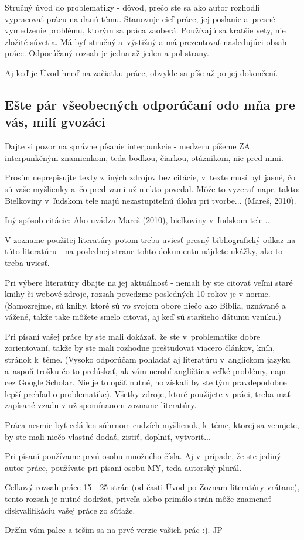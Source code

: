 \documentclass[../praca.tex]{subfiles}
\begin{document}
Stručný úvod do problematiky - dôvod, prečo ste sa ako autor rozhodli vypracovať
prácu na danú tému. Stanovuje cieľ práce, jej poslanie a~presné vymedzenie
problému, ktorým sa práca zaoberá. Používajú sa kratšie vety, nie zložité
súvetia. Má byť stručný a~výstižný a má prezentovať nasledujúci obsah práce.
Odporúčaný rozsah je jedna až jeden a pol strany. 

Aj keď je Úvod hneď na začiatku práce, obvykle sa píše až po jej dokončení. 

\subsection{Ešte pár všeobecných odporúčaní odo mňa pre vás, milí gvozáci}

Dajte si pozor na správne písanie interpunkcie - medzeru píšeme ZA interpunkčným
znamienkom, teda bodkou, čiarkou, otáznikom, nie pred nimi.

Prosím neprepisujte texty z~iných zdrojov bez citácie, v~texte musí byť jasné,
čo sú vaše myšlienky a~čo pred vami už niekto povedal. Môže to vyzerať napr.
takto:
Bielkoviny v~ľudskom tele majú nezastupiteľnú úlohu pri tvorbe... (Mareš,
2010).

Iný spôsob citácie: Ako uvádza Mareš (2010), bielkoviny v~ľudskom tele...

V zozname použitej literatúry potom treba uviesť presný bibliografický odkaz na
túto literatúru - na poslednej strane tohto dokumentu nájdete ukážky, ako to
treba uviesť.

Pri výbere literatúry dbajte na jej aktuálnosť - nemali by ste citovať veľmi
staré knihy či webové zdroje, rozsah povedzme posledných 10 rokov je v norme.
(Samozrejme, sú knihy, ktoré sú vo svojom obore niečo ako Biblia, uznávané a
vážené, takže take môžete smelo citovať, aj keď sú staršieho dátumu vzniku.)

Pri písaní vašej práce by ste mali dokázať, že ste v~problematike dobre
zorientovaní, takže by ste mali rozhodne preštudovať viacero článkov, kníh,
stránok k~téme. (Vysoko odporúčam pohľadať aj literatúru v~anglickom jazyku
a~aspoň trošku čo-to prelúskať, ak vám nerobí angličtina veľké problémy, napr.
cez Google Scholar. Nie je to opäť nutné, no získali by ste tým pravdepodobne
lepší prehľad o problematike).
Všetky zdroje, ktoré použijete v práci, treba mať
zapísané vzadu v už spomínanom zozname literatúry.

Práca nesmie byť celá len súhrnom cudzích myšlienok, k~téme, ktorej sa venujete,
by ste mali niečo vlastné dodať, zistiť, doplniť, vytvoriť...

Pri písaní používame prvú osobu množného čísla. Aj v~prípade, že ste jediný
autor práce, používate pri písaní osobu MY, teda autorský plurál.

Celkový rozsah práce 15 - 25 strán (od časti Úvod po Zoznam literatúry vrátane),
tento rozsah je nutné dodržať, priveľa alebo primálo strán môže znamenať
diskvalifikáciu vašej práce zo súťaže.

Držím vám palce a teším sa na prvé verzie vašich prác :). JP
\end{document}
